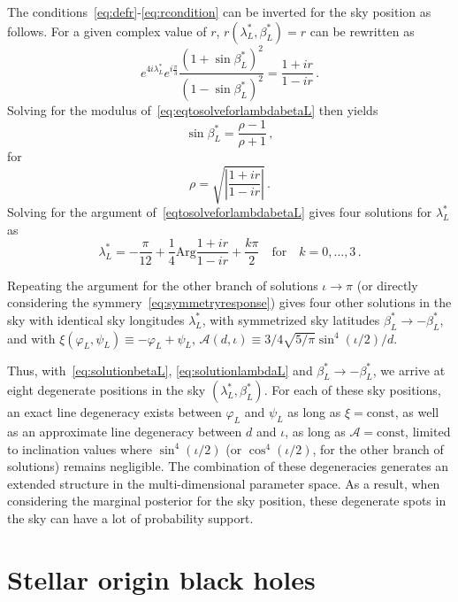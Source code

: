 \documentclass[aps,showpacs,twocolumn,prd,superscriptaddress,nofootinbib]{revtex4}
\newcommand{\be}{\begin{equation}}
\newcommand{\ee}{\end{equation}}
\newcommand\calA{{\mathcal{A}}}
\newcommand\varphiL{{\varphi_{L}}}
\newcommand\psiL{{\psi_{L}}}
\begin{document}
The conditions~\eqref{eq:defr}-\eqref{eq:rcondition} can be inverted for the sky position as follows. For a given complex value of $r$, $r(\lambda_{L}^{*}, \beta_{L}^{*}) = r$ can be rewritten as
\be\label{eq:eqtosolveforlambdabetaL}
	e^{4i\lambda_{L}^{*}}e^{i\frac{\pi}{3}} \frac{\left( 1 +\sin\beta_{L}^{*} \right)^{2}}{\left( 1 - \sin\beta_{L}^{*} \right)^{2}} = \frac{1+ i r}{1 - i r} \,.
\ee
Solving for the modulus of~\eqref{eq:eqtosolveforlambdabetaL} then yields
\be\label{eq:solutionbetaL}
	\sin\beta_{L}^{*} = \frac{\rho - 1}{\rho + 1} \,,
\ee
for
\be
	\rho = \sqrt{\left| \frac{1+ i r}{1 - i r} \right|} \,.
\ee
Solving for the argument of~\eqref{eqtosolveforlambdabetaL} gives four solutions for $\lambda_{L}^{*}$ as
\be\label{eq:solutionlambdaL}
	\lambda_{L}^{*} = - \frac{\pi}{12} + \frac{1}{4}\mathrm{Arg} \frac{1+ i r}{1 - i r} + \frac{k \pi}{2} \quad \mathrm{for} \quad k = 0,\dots,3 \,.
\ee

Repeating the argument for the other branch of solutions $\iota \rightarrow \pi$ (or directly considering the symmery~\eqref{eq:symmetryresponse}) gives four other solutions in the sky with identical sky longitudes $\lambda_{L}^{*}$, with symmetrized sky latitudes $\beta_{L}^{*} \rightarrow -\beta_{L}^{*}$, and with $\xi (\varphiL, \psiL) \equiv -\varphiL + \psiL$, $\calA(d, \iota) \equiv 3/4\sqrt{5/\pi}\sin^{4}(\iota/2)/d $.

Thus, with~\eqref{eq:solutionbetaL}, \eqref{eq:solutionlambdaL} and $\beta_{L}^{*} \rightarrow -\beta_{L}^{*}$, we arrive at eight degenerate positions in the sky $(\lambda_{L}^{*}, \beta_{L}^{*})$. For each of these sky positions, an exact line degeneracy exists between $\varphiL$ and $\psiL$ as long as $\xi = \mathrm{const}$, as well as an approximate line degeneracy between $d$ and $\iota$, as long as $\calA = \mathrm{const}$, limited to inclination values where $\sin^{4}(\iota/2)$ (or $\cos^{4}(\iota/2)$, for the other branch of solutions) remains negligible. The combination of these degeneracies generates an extended structure in the multi-dimensional parameter space. As a result, when considering the marginal posterior for the sky position, these degenerate spots in the sky can have a lot of probability support.


\section{Stellar origin black holes}
\label{sec:SOBH}
\end{document}
